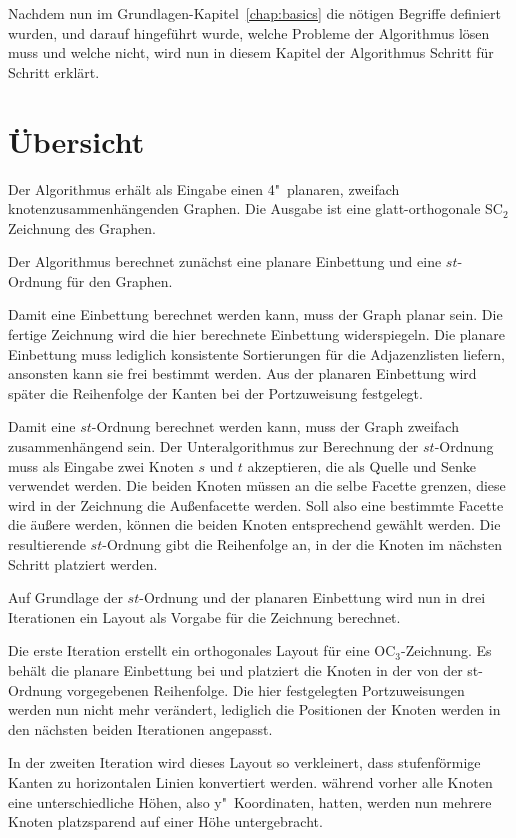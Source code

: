 \documentclass[a4paper]{scrreprt}
\theoremstyle{definition}
\begin{document}
Nachdem nun im Grundlagen-Kapitel~\ref{chap:basics} die nötigen Begriffe definiert wurden, und darauf hingeführt wurde, welche Probleme der Algorithmus lösen muss und welche nicht, wird nun in diesem Kapitel der Algorithmus Schritt für Schritt erklärt.

\section{Übersicht}

Der Algorithmus erhält als Eingabe einen 4"~planaren, zweifach knotenzusammenhängenden Graphen. Die Ausgabe ist eine glatt-orthogonale SC$_2$ Zeichnung des Graphen.

Der Algorithmus berechnet zunächst eine planare Einbettung und eine $st$-Ordnung für den Graphen.

Damit eine Einbettung berechnet werden kann, muss der Graph planar sein. Die fertige Zeichnung wird die hier berechnete Einbettung widerspiegeln. Die planare Einbettung muss lediglich konsistente Sortierungen für die Adjazenzlisten liefern, ansonsten kann sie frei bestimmt werden. Aus der planaren Einbettung wird später die Reihenfolge der Kanten bei der Portzuweisung festgelegt.

Damit eine $st$-Ordnung berechnet werden kann, muss der Graph zweifach zusammenhängend sein. Der Unteralgorithmus zur Berechnung der $st$-Ordnung muss als Eingabe zwei Knoten $s$ und $t$ akzeptieren, die als Quelle und Senke verwendet werden. Die beiden Knoten müssen an die selbe Facette grenzen, diese wird in der Zeichnung die Außenfacette werden. Soll also eine bestimmte Facette die äußere werden, können die beiden Knoten entsprechend gewählt werden. Die resultierende $st$-Ordnung gibt die Reihenfolge an, in der die Knoten im nächsten Schritt platziert werden.

Auf Grundlage der $st$-Ordnung und der planaren Einbettung wird nun in drei Iterationen ein Layout als Vorgabe für die Zeichnung berechnet. 

Die erste Iteration erstellt ein orthogonales Layout für eine OC$_3$-Zeichnung. Es behält die planare Einbettung bei und platziert die Knoten in der von der st-Ordnung vorgegebenen Reihenfolge. Die hier festgelegten Portzuweisungen werden nun nicht mehr verändert, lediglich die Positionen der Knoten werden in den nächsten beiden Iterationen angepasst.

In der zweiten Iteration wird dieses Layout so verkleinert, dass stufenförmige Kanten zu horizontalen Linien konvertiert werden. während vorher alle Knoten eine unterschiedliche Höhen, also y"~Koordinaten, hatten, werden nun mehrere Knoten platzsparend auf einer Höhe untergebracht.
\end{document}
